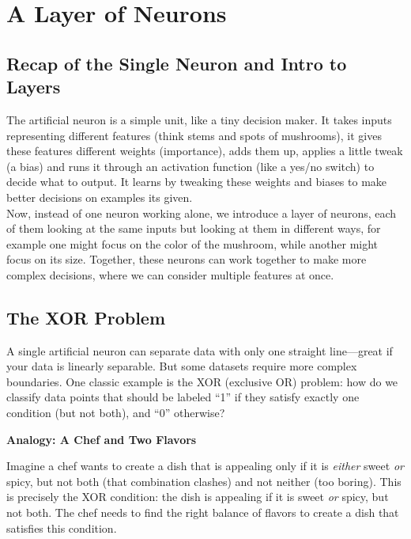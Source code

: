\documentclass[9pt]{extarticle}
\begin{document}
\pagebreak


\section{A Layer of Neurons}
\subsection{Recap of the Single Neuron and Intro to Layers}
The artificial neuron is a simple unit, like a tiny decision maker. It takes inputs representing different features (think stems and spots of mushrooms), it gives these features different weights (importance), adds them up, applies a little tweak (a bias) and runs it through an activation function (like a yes/no switch) to decide what to output. It learns by tweaking these weights and biases to make better decisions on examples its given. \\ [2ex]
Now, instead of one neuron working alone, we introduce a layer of neurons, each of them looking at the same inputs but looking at them in different ways, for example one might focus on the color of the mushroom, while another might focus on its size. Together, these neurons can work together to make more complex decisions, where we can consider multiple features at once.

\subsection{The XOR Problem}
A single artificial neuron can separate data with only one straight line—great if your data is linearly separable. But some datasets require more complex boundaries. One classic example is the XOR (exclusive OR) problem: how do we classify data points that should be labeled “1” if they satisfy exactly one condition (but not both), and “0” otherwise?

\vspace{1em} \noindent \textbf{Analogy: A Chef and Two Flavors}

\noindent Imagine a chef wants to create a dish that is appealing only if it is \textit{either} sweet \textit{or} spicy, but not both (that combination clashes) and not neither (too boring). This is precisely the XOR condition: the dish is appealing if it is sweet \textit{or} spicy, but not both. The chef needs to find the right balance of flavors to create a dish that satisfies this condition.
\end{document}
